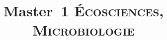 \usepackage{fontspec}
\usepackage{lipsum} %
\usepackage{blindtext} %
\usepackage{polyglossia} %
    \setmainlanguage{french}
\usepackage{fancyhdr} %
\usepackage[version=3]{mhchem} %
\usepackage{cancel} %
\usepackage[a4paper, bottom=3cm, right=4.5cm]{geometry} %
\usepackage{url} %

\setcounter{tocdepth}{3} %
\setdefaultlanguage{french} %
\setmainlanguage{french}

\pagestyle{fancy} %




\title{Master 1 \textsc{Écosciences, Microbiologie}} %

